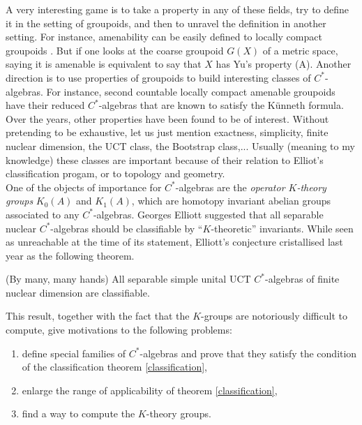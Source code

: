 A very interesting game is to take a property in any of these fields, try to define it in the setting of groupoids, and then to unravel the definition in another setting. For instance, amenability can be easily defined to locally compact groupoids \cite{}. But if one looks at the coarse groupoid $G(X)$ of a metric space, saying it is amenable is equivalent to say that $X$ has Yu's property (A). Another direction is to use properties of groupoids to build interesting classes of $C^*$-algebras. For instance, second countable locally compact amenable groupoids have their reduced $C^*$-algebras that are known to satisfy the K\"unneth formula. \\

Over the years, other properties have been found to be of interest. Without pretending to be exhaustive, let us just mention exactness, simplicity, finite nuclear dimension, the UCT class, the Bootstrap class,... Usually (meaning to my knowledge) these classes are important because of their relation to Elliot's classification progam, or to topology and geometry. \\

One of the objects of importance for $C^*$-algebras are the \textit{operator $K$-theory groups} $K_0(A)$ and $K_1(A)$, which are homotopy invariant abelian groups associated to any $C^*$-algebras. Georges Elliott suggested that all separable nuclear $C^*$-algebras should be classifiable by ``$K$-theoretic'' invariants. While seen as unreachable at the time of its statement, Elliott's conjecture cristallised last year as the following theorem.

\begin{theorem}\label{classification}(By many, many hands) All separable simple unital UCT $C^*$-algebras of finite nuclear dimension are classifiable.
\end{theorem}

This result, together with the fact that the $K$-groups are notoriously difficult to compute, give motivations to the following problems:
\begin{enumerate}
\item define special families of $C^*$-algebras and prove that they satisfy the condition of the classification theorem \ref{classification},
\item enlarge the range of applicability of theorem \ref{classification},
\item find a way to compute the $K$-theory groups.
\end{enumerate}    

